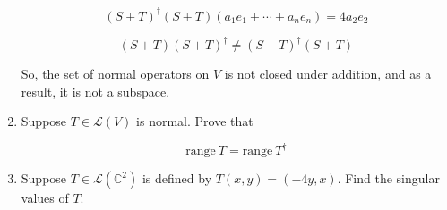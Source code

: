 \documentclass[fleqn]{article}
\makeatletter
\newenvironment{equationCenter}{\@fleqnfalse\begin{equation*}}{\end{equation*}}
\makeatother
\begin{document}
\begin{enumerate}[nolistsep]
		\begin{equation*}
			(S + T)^{\dag}(S + T)(a_1e_1 + \cdots + a_ne_n) = 4a_2e_2
		\end{equation*}
		
		\begin{equation*}
			(S + T)(S + T)^{\dag} \neq (S + T)^{\dag}(S + T)
		\end{equation*}
		
		So, the set of normal operators on $V$ is not closed under addition, and as a result, it is not a subspace.
		
		\item Suppose $T \in \mathcal{L}(V)$ is normal. Prove that
		
			\begin{equationCenter}
				\text{range}\ T = \text{range}\ T^{\dag}
			\end{equationCenter}
			
		\item Suppose $T \in \mathcal{L}(\mathbb{C}^2)$ is defined by $T(x,y) = (-4y, x)$. Find the singular values of $T$.
	\end{enumerate}
\end{document}
